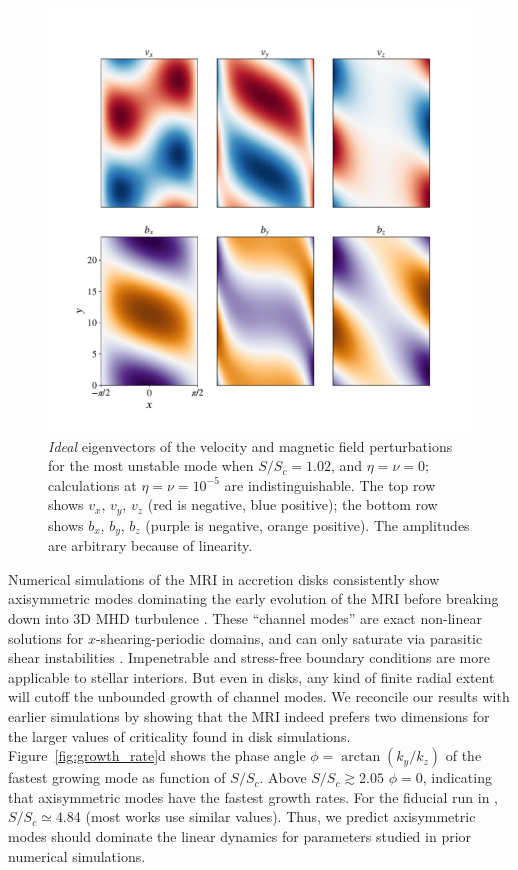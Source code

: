 \documentclass[aps,prl,reprint,superscriptaddress]{revtex4-1}
\newcommand{\SSC}{S/S_{c}}
\begin{document}
\begin{figure}[h!]
  \centering
  \includegraphics[width=\columnwidth]{eigvecs_xy_run_11_ideal_single_mode.pdf}
  \caption{\textit{Ideal} eigenvectors of the velocity and magnetic field perturbations for the most unstable mode when $\SSC=1.02$, and $\eta=\nu=0$; calculations at $\eta=\nu=10^{-5}$ are indistinguishable.
  The top row shows $v_{x}$, $v_{y}$, $v_{z}$ (red is negative, blue positive); the bottom row shows $b_{x}$, $b_{y}$, $b_{z}$ (purple is negative, orange positive). 
The amplitudes are arbitrary because of linearity.}
  \label{fig:eigvec}
\end{figure}

Numerical simulations of the MRI in accretion disks consistently show axisymmetric modes dominating the early evolution of the MRI before breaking down into 3D MHD turbulence \citep{1995ApJ...440..742H,2018ApJ...853..174H,2019ApJS..241...26D}. 
These ``channel modes'' are exact non-linear solutions for $x$-shearing-periodic domains, and can only saturate via parasitic shear instabilities \citep{1994ApJ...432..213G}.
Impenetrable and stress-free boundary conditions are more applicable to stellar interiors. 
But even in disks, any kind of finite radial extent will cutoff the unbounded growth of channel modes. 
We reconcile our results with earlier simulations by showing that the MRI indeed prefers two dimensions for the larger values of criticality found in disk simulations. 
Figure~\ref{fig:growth_rate}d shows the phase angle $\phi=\arctan(k_{y}/k_{z})$ of the fastest growing mode as function of $\SSC$.
Above $\SSC\gtrsim2.05$ $\phi=0$, indicating that axisymmetric modes have the fastest growth rates.
For the fiducial run in \citet{1996ApJ...464..690H}, $\SSC\simeq4.84$ (most works use similar values).
Thus, we predict axisymmetric modes should dominate the linear dynamics for parameters studied in prior numerical simulations.
\end{document}
